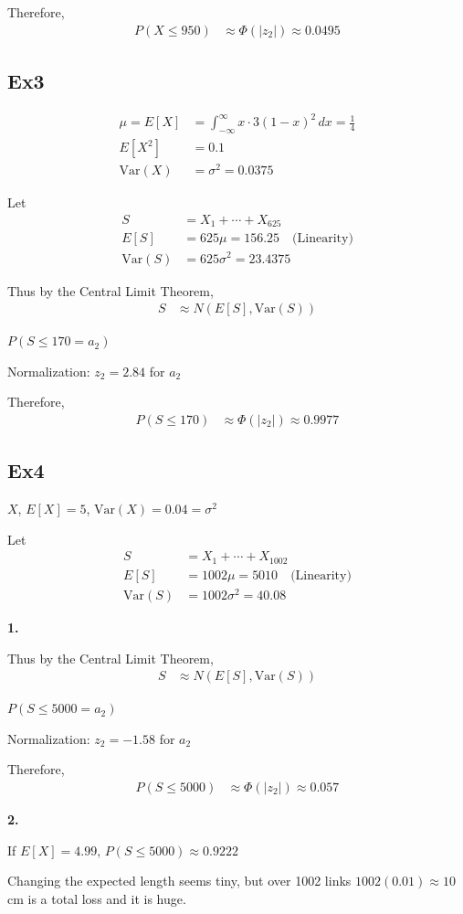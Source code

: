 \documentclass[12pt, a4paper]{article}
\begin{document}
Therefore,
\begin{align*}
P(X \leq 950) &\approx \Phi(|z_2|) \approx 0.0495
\end{align*}

\subsection*{Ex3}

\begin{align*}
\mu = E[X] &= \int_{-\infty}^{\infty} x \cdot 3(1 - x)^2 \, dx = \frac{1}{4} \\
E[X^2] &= 0.1 \\
\text{Var}(X) &= \sigma^2 = 0.0375
\end{align*}

Let
\begin{align*}
S &= X_1 + \cdots + X_{625} \\
E[S] &= 625\mu = 156.25 \quad \text{(Linearity)} \\
\text{Var}(S) &= 625\sigma^2 = 23.4375
\end{align*}

Thus by the Central Limit Theorem,
\begin{align*}
S &\approx N(E[S], \text{Var}(S))
\end{align*}

$P(S \leq 170 = a_2)$

Normalization: $z_2 = 2.84$ for $a_2$

Therefore,
\begin{align*}
P(S \leq 170) &\approx \Phi(|z_2|) \approx 0.9977
\end{align*}

\subsection*{Ex4}

$X$, $E[X] = 5$, $\text{Var}(X) = 0.04 = \sigma^2$

Let
\begin{align*}
S &= X_1 + \cdots + X_{1002} \\
E[S] &= 1002\mu = 5010 \quad \text{(Linearity)} \\
\text{Var}(S) &= 1002\sigma^2 = 40.08
\end{align*}

\textbf{1.}

Thus by the Central Limit Theorem,
\begin{align*}
S &\approx N(E[S], \text{Var}(S))
\end{align*}

$P(S \leq 5000 = a_2)$

Normalization: $z_2 = -1.58$ for $a_2$

Therefore,
\begin{align*}
P(S \leq 5000) &\approx \Phi(|z_2|) \approx 0.057
\end{align*}

\textbf{2.}

If $E[X] = 4.99$, $P(S \leq 5000) \approx 0.9222$

Changing the expected length seems tiny, but over 1002 links $1002(0.01) \approx 10$ cm is a total loss and it is huge.
\end{document}
